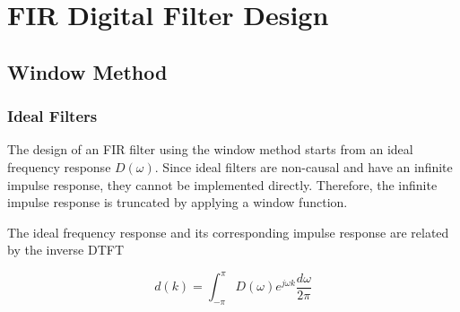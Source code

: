 
\section{FIR Digital Filter Design}

\subsection{Window Method}

\subsubsection{Ideal Filters}

The design of an FIR filter using the window method starts from an ideal
frequency response $D(\omega)$. Since ideal filters are non-causal and
have an infinite impulse response, they cannot be implemented directly.
Therefore, the infinite impulse response is truncated by applying a
window function.

The ideal frequency response and its corresponding impulse response are
related by the inverse DTFT

\begin{equation}
d(k)=\int_{-\pi}^{\pi}
D(\omega)e^{j\omega k}
\frac{d\omega}{2\pi}
\label{eq:impresp}
\end{equation}


